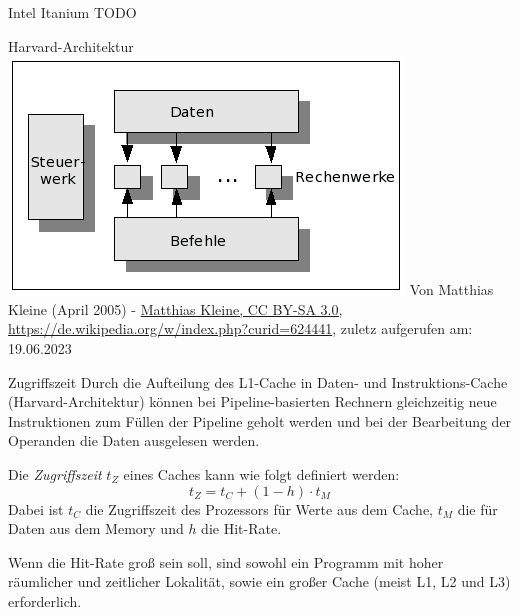 \begin{example}[Cachehierarchie]{Intel Itanium}
    TODO
\end{example}

\begin{example}[Cachehierarchie]{Harvard-Architektur}
    \includegraphics[width=\textwidth]{images/harvard_architektur.png}
    Von Matthias Kleine (April 2005) - \url{Matthias Kleine, CC BY-SA 3.0, https://de.wikipedia.org/w/index.php?curid=624441}, zuletz aufgerufen am: 19.06.2023
\end{example}

\begin{defi}[Cache]{Zugriffszeit}
    Durch die Aufteilung des L1-Cache in Daten- und Instruktions-Cache (Harvard-Architektur) können bei Pipeline-basierten Rechnern gleichzeitig neue Instruktionen zum Füllen der Pipeline geholt werden und bei der Bearbeitung der Operanden die Daten ausgelesen werden.
    
    Die \emph{Zugriffszeit} $t_Z$ eines Caches kann wie folgt definiert werden:
    \[
        t_Z = t_{C} + (1 - h) \cdot t_{M}
    \]
    Dabei ist $t_C$ die Zugriffszeit des Prozessors für Werte aus dem Cache, $t_M$ die für Daten aus dem Memory und $h$ die Hit-Rate.
    
    Wenn die Hit-Rate groß sein soll, sind sowohl ein Programm mit hoher räumlicher und zeitlicher Lokalität, sowie ein großer Cache (meist L1, L2 und L3) erforderlich.
\end{defi}

